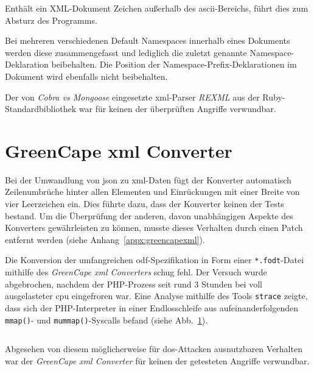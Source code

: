 Enthält ein XML-Dokument Zeichen außerhalb des \acrshort{ascii}-Bereichs, führt dies zum Absturz des Programms.

Bei mehreren verschiedenen Default Namespaces innerhalb eines Dokuments werden diese zusammengefasst und lediglich die zuletzt genannte Namespace-Deklaration beibehalten. Die Position der Namespace-Prefix-Deklarationen im Dokument wird ebenfalls nicht beibehalten.

Der von \emph{Cobra vs Mongoose} eingesetzte \acrshort{xml}-Parser \emph{REXML} aus der Ruby\hyp{}Standardbibliothek war für keinen der überprüften Angriffe verwundbar.

\section{GreenCape \acrshort{xml} Converter}
\label{sec:greencapexml}

Bei der Umwandlung von \acrshort{json} zu \acrshort{xml}-Daten fügt der Konverter automatisch Zeilen\-umbrüche hinter allen Elementen und Einrückungen mit einer Breite von vier Leerzeichen ein. Dies führte dazu, dass der Konverter keinen der Tests bestand. Um die Überprüfung der anderen, davon unabhängigen Aspekte des Konverters gewährleisten zu können, musste dieses Verhalten durch einen Patch entfernt werden (siehe Anhang~\ref{appx:greencapexml}).

Die Konversion der umfangreichen \acrshort{odf}-Spezifikation in Form einer \texttt{*.fodt}-Datei mithilfe des \emph{GreenCape \acrshort{xml} Converters} schug fehl. Der Versuch wurde abgebrochen, nachdem der PHP-Prozess seit rund 3 Stunden bei voll ausgelasteter \acrshort{cpu} eingefroren war. Eine Analyse mithilfe des Tools \texttt{strace} zeigte, dass sich der PHP-Interpreter in einer Endlosschleife aus aufeinanderfolgenden \texttt{mmap()}- und \texttt{mummap()}-Syscalls befand (siehe Abb.~\ref{fig:greencapeloop}).

\begin{figure}[bp!]
    \inputminted{shell-session}{greencapexml-strace.txt}
    \label{fig:greencapeloop}
\end{figure}

Abgesehen von diesem möglicherweise für \acrshort{dos}-Attacken ausnutzbaren Verhalten war der \emph{GreenCape \acrshort{xml} Converter} für keinen der getesteten Angriffe verwundbar.

